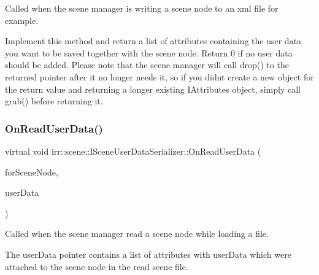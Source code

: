 Called when the scene manager is writing a scene node to an xml file for example. 

Implement this method and return a list of attributes containing the user data you want to be saved together with the scene node. Return 0 if no user data should be added. Please note that the scene manager will call drop() to the returned pointer after it no longer needs it, so if you didn\textquotesingle{}t create a new object for the return value and returning a longer existing I\+Attributes object, simply call grab() before returning it. \mbox{\label{classirr_1_1scene_1_1ISceneUserDataSerializer_a48276bde0e05343d39ec25c6933f122d}} 
\subsubsection{\texorpdfstring{On\+Read\+User\+Data()}{OnReadUserData()}\hspace{0.1cm}{\footnotesize\ttfamily [1/2]}}
{\footnotesize\ttfamily virtual void irr\+::scene\+::\+I\+Scene\+User\+Data\+Serializer\+::\+On\+Read\+User\+Data (\begin{DoxyParamCaption}\item[{\hyperlink{classirr_1_1scene_1_1ISceneNode}{I\+Scene\+Node} $\ast$}]{for\+Scene\+Node,  }\item[{\hyperlink{classirr_1_1io_1_1IAttributes}{io\+::\+I\+Attributes} $\ast$}]{user\+Data }\end{DoxyParamCaption})\hspace{0.3cm}{\ttfamily [pure virtual]}}



Called when the scene manager read a scene node while loading a file. 

The user\+Data pointer contains a list of attributes with user\+Data which were attached to the scene node in the read scene file. \mbox{\label{classirr_1_1scene_1_1ISceneUserDataSerializer_a48276bde0e05343d39ec25c6933f122d}} 

